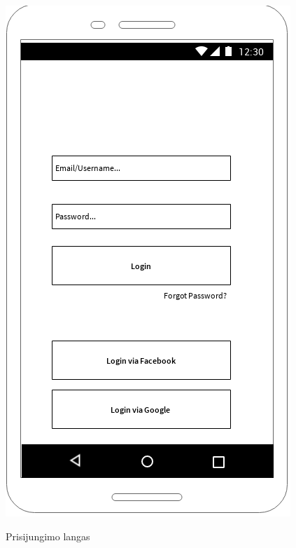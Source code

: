 \documentclass{VUMIFPSkursinis}
\begin{document}
\begin{figure}[H]
	\centering
	\caption{Prisijungimo langas}
	\includegraphics[scale=0.9]{img/login_window}
	\label{img:login_window}
\end{figure}
\end{document}
